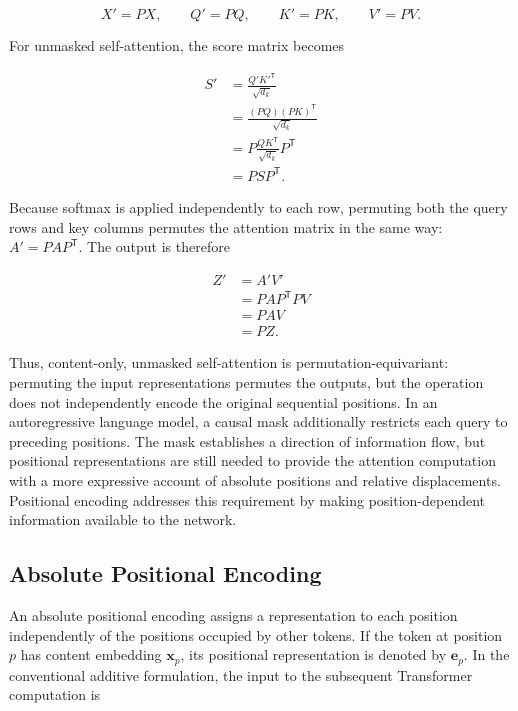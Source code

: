 \begin{equation}
    X'=PX,\qquad Q'=PQ,\qquad K'=PK,\qquad V'=PV.
    \label{eq:pe-permuted-qkv}
\end{equation}

For unmasked self-attention, the score matrix becomes

\begin{align}
    S'
    &=\frac{Q'K'^{\mathsf T}}{\sqrt{d_k}}\\
    &=\frac{(PQ)(PK)^{\mathsf T}}{\sqrt{d_k}}\\
    &=P\frac{QK^{\mathsf T}}{\sqrt{d_k}}P^{\mathsf T}\\
    &=PSP^{\mathsf T}.
    \label{eq:pe-permuted-scores}
\end{align}

Because softmax is applied independently to each row, permuting both the
query rows and key columns permutes the attention matrix in the same way:
\(A'=PAP^{\mathsf T}\). The output is therefore

\begin{align}
    Z'
    &=A'V'\\
    &=PAP^{\mathsf T}PV\\
    &=PAV\\
    &=PZ.
    \label{eq:pe-permutation-equivariance}
\end{align}

Thus, content-only, unmasked self-attention is permutation-equivariant:
permuting the input representations permutes the outputs, but the operation
does not independently encode the original sequential positions. In an
autoregressive language model, a causal mask additionally restricts each
query to preceding positions. The mask establishes a direction of information
flow, but positional representations are still needed to provide the
attention computation with a more expressive account of absolute positions
and relative displacements. Positional encoding addresses this requirement
by making position-dependent information available to the network.

\subsection{Absolute Positional Encoding}
\label{subsec:pe-absolute}

An absolute positional encoding assigns a representation to each position
independently of the positions occupied by other tokens. If the token at
position \(p\) has content embedding \(\mathbf{x}_p\), its positional
representation is denoted by \(\mathbf{e}_p\). In the conventional additive
formulation, the input to the subsequent Transformer computation is

